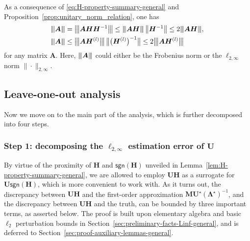 \begin{remark}\label{remark:AH-norm-bound} As a consequence of \eqref{eq:H-property-summary-general}
and Proposition~\ref{prop:unitary_norm_relation}, one has \begin{subequations}
\label{eq:A-2inf-H-Hl-general}
\begin{align}
\vertiii{\bm{A}} & =\vertiiibig{\bm{A}\bm{H}\bm{H}^{-1}}\leq\vertiii{\bm{A}\bm{H}}\,\big\|\bm{H}^{-1}\big\|\leq2\vertiii{\bm{A}\bm{H}}, \label{eq:A-2inf-H-general}\\
\vertiii{\bm{A}} & \leq\vertiiibig{\bm{A}\bm{H}^{(l)}}\,\big\|\big(\bm{H}^{(l)}\big)^{-1}\big\|\leq2\vertiiibig{\bm{A}\bm{H}^{(l)}}\label{eq:A-2inf-Hl-general}
\end{align}
\end{subequations} for any matrix $\bm{A}$. Here, ${\left\vert\kern-0.25ex\left\vert\kern-0.25ex\left\vert \bm{A} \right\vert\kern-0.25ex\right\vert\kern-0.25ex\right\vert}$ could either be the Frobenius norm or the $\ell_{2,\infty}$
norm $\|\cdot\|_{2,\infty}$. \end{remark}




\subsection{Leave-one-out analysis}

Now we move on to the main part of the analysis, which is further decomposed into four steps. 

\subsubsection{Step 1: decomposing the $\ell_{2,\infty}$ estimation error of $\bm{U}$}




By virtue of the proximity of  $\bm{H}$ and $\mathsf{sgn}(\bm{H})$ unveiled in Lemma~\ref{lem:H-property-summary-general}, we are allowed to employ $\bm{U}\bm{H}$ as a surrogate for $\bm{U}\mathsf{sgn}(\bm{H})$, which is more convenient to work with. As it turns out, the discrepancy between $\bm{U}\bm{H}$ and the first-order approximation $\bm{M}\bm{U}^{\star}(\bm{\Lambda}^{\star})^{-1}$, and the discrepancy between $\bm{U}\bm{H}$ and the truth,  can be bounded by three important terms, as asserted below. The proof is built upon elementary  algebra and basic $\ell_2$ perturbation bounds in Section~\ref{sec:preliminary-facts-Linf-general}, and is deferred to Section~\ref{sec:proof-auxiliary-lemmas-general}.




